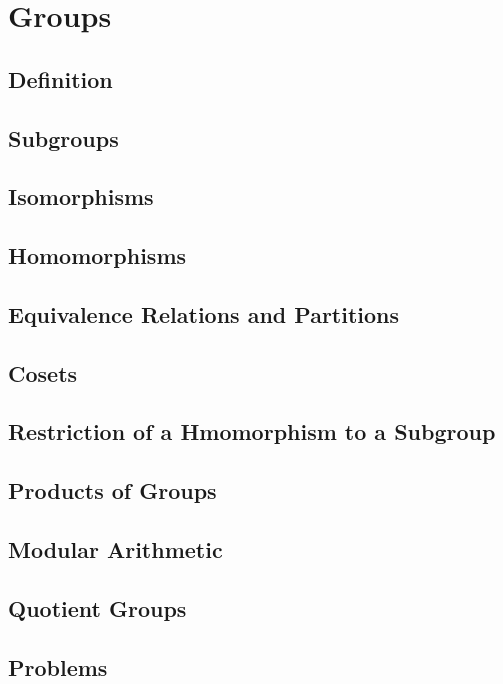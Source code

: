 \chapter{Groups}
\section{Definition}
\section{Subgroups}
\section{Isomorphisms}
\section{Homomorphisms}
\section{Equivalence Relations and Partitions}
\section{Cosets}
\section{Restriction of a Hmomorphism to a Subgroup}
\section{Products of Groups}
\section{Modular Arithmetic}
\section{Quotient Groups}
\section{Problems}